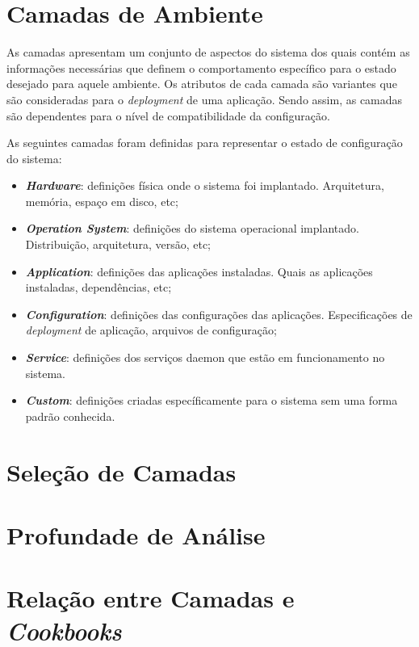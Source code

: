 \section{Camadas de Ambiente}

As camadas apresentam um conjunto de aspectos do sistema dos quais contém as
informações necessárias que definem o comportamento específico para o
estado desejado para aquele ambiente. Os atributos de cada camada são variantes
que são consideradas para o \textit{deployment} de uma aplicação. Sendo assim, as
camadas são dependentes para o nível de compatibilidade da configuração.

As seguintes camadas foram definidas para representar o estado de configuração do
sistema:
\begin{itemize}
  \item \textit{\textbf{Hardware}}: definições física onde o sistema foi implantado.
    Arquitetura, memória, espaço em disco, etc;
  \item \textit{\textbf{Operation System}}: definições do sistema operacional
    implantado. Distribuição, arquitetura, versão, etc;
  \item \textit{\textbf{Application}}: definições das aplicações instaladas.
    Quais as aplicações instaladas, dependências, etc;
  \item \textit{\textbf{Configuration}}: definições das configurações das
    aplicações. Especificações de \textit{deployment} de aplicação, arquivos
    de configuração;
  \item \textit{\textbf{Service}}: definições dos serviços daemon que estão em
    funcionamento no sistema.
  \item \textit{\textbf{Custom}}: definições criadas específicamente para o
    sistema sem uma forma padrão conhecida.
\end{itemize}

\subsection{}

\section{Seleção de Camadas}

\section{Profundade de Análise}

\section{Relação entre Camadas e \textit{Cookbooks}}

